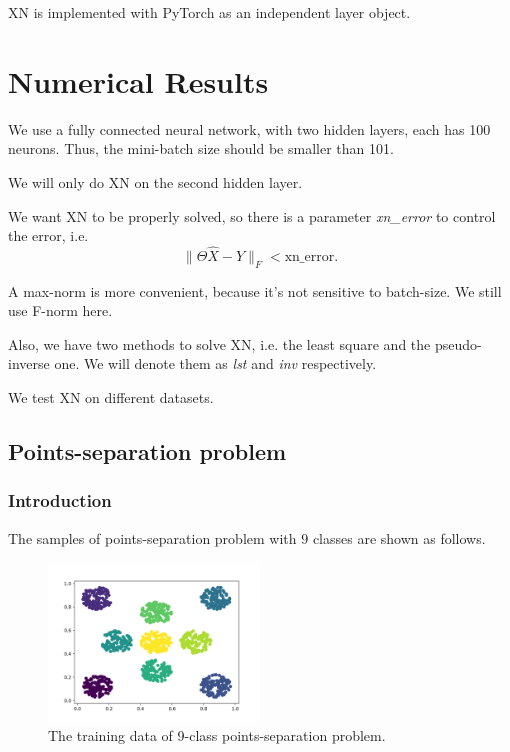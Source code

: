 XN is implemented with PyTorch as an independent layer object.

\section{Numerical Results}

We use a fully connected neural network, with two hidden layers, each has 100 neurons. Thus, the mini-batch size should be smaller than 101.

We will only do XN on the second hidden layer.

We want XN to be properly solved, so there is a parameter \emph{xn\_error} to control the error, i.e.
\begin{equation}
	\|\Theta \hat X-Y\|_F<\text{xn\_error}.
\end{equation}

A max-norm is more convenient, because it's not sensitive to batch-size. We still use F-norm here.

Also, we have two methods to solve XN, i.e. the least square and the pseudo-inverse one. We will denote them as \emph{lst} and \emph{inv} respectively.

We test XN on different datasets. 

\subsection{Points-separation problem}
\subsubsection{Introduction}
The samples of points-separation problem with $9$ classes are shown as follows.

\begin{figure}[H]
	\center
	\includegraphics*[width=0.5\textwidth]{./figures/XN_Points_show.png}
	\caption{The training data of 9-class points-separation problem.}
\end{figure}

